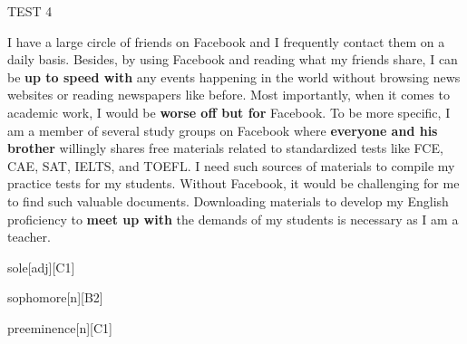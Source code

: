 \begin{glossarymc}[Cambridge 13]
\begin{test}{TEST 4}
\begin{qa}
    I have a large circle of friends on Facebook and I frequently contact them on a daily basis. Besides, by using Facebook and reading what my friends share, I can be \textbf{up to speed with} any events happening in the world without browsing news websites or reading newspapers like before. Most importantly, when it comes to academic work, I would be \textbf{worse off but for} Facebook. To be more specific, I am a member of several study groups on Facebook where \textbf{everyone and his brother} willingly shares free materials related to standardized tests like FCE, CAE, SAT, IELTS, and TOEFL. I need such sources of materials to compile my practice tests for my students. Without Facebook, it would be challenging for me to find such valuable documents. Downloading materials to develop my English proficiency to \textbf{meet up with} the demands of my students is necessary as I am a teacher.
    \end{qa}

        \begin{VocabExplain}[Part 2]
            \begin{ExplainCard}{sole}[adj][C1]
            \end{ExplainCard}

            \begin{ExplainCard}{sophomore}[n][B2]
            \end{ExplainCard}

            \begin{ExplainCard}{preeminence}[n][C1]
            \end{ExplainCard}


\end{VocabExplain}
\end{test}
\end{glossarymc}
